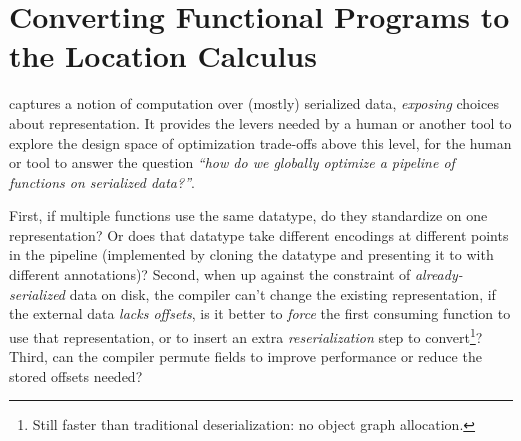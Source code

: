 

\section{Converting Functional Programs to the Location Calculus}\label{sec:infer-local}

\ourcalc{} captures a notion of computation over (mostly) serialized data,
\emph{exposing} choices about representation. It provides the levers needed by a human
or another tool to explore the design space of optimization trade-offs above
this level, \ie{} for the human or tool to answer the question
\emph{``how do we globally optimize a pipeline of functions on serialized data?''}.

   First, if multiple functions use the same datatype, do they standardize on one
    representation?  Or does that datatype take different encodings at different
    points in the pipeline (implemented by cloning the datatype and
    presenting it to \ourcalc with different annotations)?
%
    Second, when up against the constraint of {\em already-serialized} data on
    disk, the compiler can't change the existing representation, if the
    external data \emph{lacks offsets}, is it better to \emph{force}
    the first consuming function to use that representation, or to insert an
    extra {\em reserialization} step to convert\footnote{Still faster
    than traditional deserialization: no object graph allocation.}?
%
    Third, can the compiler permute fields to improve performance or reduce the
    stored offsets needed?


